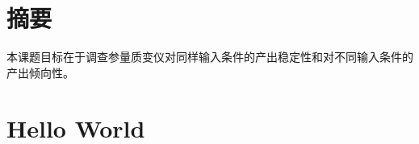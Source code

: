 \documentclass[a4paper,11pt]{article}
\begin{document}

\fulldoctitle


\section*{摘要}

本课题目标在于调查参量质变仪对同样输入条件的产出稳定性和对不同输入条件的产出倾向性。

\Nmaketoc

\section{Hello World}
\end{document}
